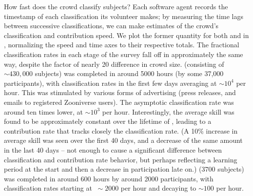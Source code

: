 \documentclass[useAMS,usenatbib,a4paper]{mn2e}
\begin{document}
How fast does the \SW crowd classify subjects? Each software agent records the timestamp
of each classification its volunteer makes; by measuring the time lags between
successive classifications, we can make estimates of the crowd's classification
and contribution speed. We plot the former quantity for both \StageOne and
\StageTwo in , normalizing the speed and time axes to
their respective totals. The fractional classification rates
in each stage of the survey fall off in approximately the same way, despite the
factor of nearly 20 difference in crowd size. \StageOne (consisting of
$\sim430,000$ subjects) was completed in around 5000 hours (by some 37,000
participants), with classification rates in the first few days averaging at
$\sim10^4$ per hour. This was stimulated by various forms of advertising (press
releases, and emails to registered Zooniverse users). The asymptotic
classification rate was  around ten times lower, at $\sim10^3$ per hour.
Interestingly, the average skill was found to be approximately constant over the
lifetime of \StageOne, leading to a contribution rate that tracks closely the
classification rate. (A 10\% increase in average skill was seen over the first
40 days, and a decrease of the same amount in the last 40 days -- not enough to
cause a significant difference between classification and contribution rate
behavior, but perhaps reflecting a learning period at the start and then a
decrease
in participation late on.) \StageTwo (3700 subjects) was completed in around 600
hours by around 2000 participants, with classification rates starting at
$~\sim2000$ per hour and decaying to $\sim100$ per hour.
\end{document}
